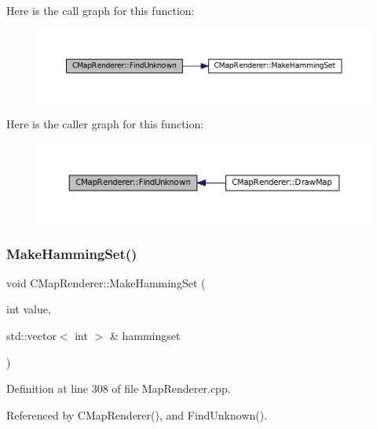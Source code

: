 Here is the call graph for this function\+:\nopagebreak
\begin{figure}[H]
\begin{center}
\leavevmode
\includegraphics[width=350pt]{classCMapRenderer_aec3c1d3294ac3af8ebb717ed5be88870_cgraph}
\end{center}
\end{figure}
Here is the caller graph for this function\+:\nopagebreak
\begin{figure}[H]
\begin{center}
\leavevmode
\includegraphics[width=350pt]{classCMapRenderer_aec3c1d3294ac3af8ebb717ed5be88870_icgraph}
\end{center}
\end{figure}
\hypertarget{classCMapRenderer_a0b06ba89b9a7ad75fa945a3c22dc019a}{}\label{classCMapRenderer_a0b06ba89b9a7ad75fa945a3c22dc019a} 
\subsubsection{\texorpdfstring{Make\+Hamming\+Set()}{MakeHammingSet()}}
{\footnotesize\ttfamily void C\+Map\+Renderer\+::\+Make\+Hamming\+Set (\begin{DoxyParamCaption}\item[{int}]{value,  }\item[{std\+::vector$<$ int $>$ \&}]{hammingset }\end{DoxyParamCaption})\hspace{0.3cm}{\ttfamily [protected]}}



Definition at line 308 of file Map\+Renderer.\+cpp.



Referenced by C\+Map\+Renderer(), and Find\+Unknown().



